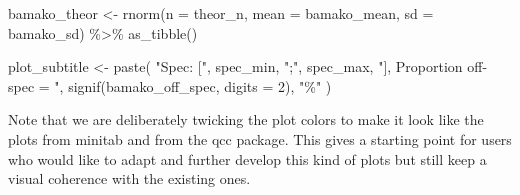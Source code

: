 \documentclass[
]{book}
\newenvironment{Shaded}{\begin{snugshade}}{\end{snugshade}}
\newcommand{\AttributeTok}[1]{\textcolor[rgb]{0.77,0.63,0.00}{#1}}
\newcommand{\DecValTok}[1]{\textcolor[rgb]{0.00,0.00,0.81}{#1}}
\newcommand{\FunctionTok}[1]{\textcolor[rgb]{0.00,0.00,0.00}{#1}}
\newcommand{\NormalTok}[1]{#1}
\newcommand{\OtherTok}[1]{\textcolor[rgb]{0.56,0.35,0.01}{#1}}
\newcommand{\SpecialCharTok}[1]{\textcolor[rgb]{0.00,0.00,0.00}{#1}}
\newcommand{\StringTok}[1]{\textcolor[rgb]{0.31,0.60,0.02}{#1}}
\begin{document}
\begin{Shaded}
\begin{Highlighting}[]
\NormalTok{bamako\_theor }\OtherTok{\textless{}{-}} \FunctionTok{rnorm}\NormalTok{(}\AttributeTok{n =}\NormalTok{ theor\_n, }\AttributeTok{mean =}\NormalTok{ bamako\_mean, }\AttributeTok{sd =}\NormalTok{ bamako\_sd) }\SpecialCharTok{\%\textgreater{}\%} 
  \FunctionTok{as\_tibble}\NormalTok{()}
\end{Highlighting}
\end{Shaded}

\begin{Shaded}
\begin{Highlighting}[]
\NormalTok{plot\_subtitle }\OtherTok{\textless{}{-}} \FunctionTok{paste}\NormalTok{(}
  \StringTok{"Spec: ["}\NormalTok{, spec\_min, }\StringTok{";"}\NormalTok{, spec\_max, }
  \StringTok{"], Proportion off{-}spec = "}\NormalTok{,}
  \FunctionTok{signif}\NormalTok{(bamako\_off\_spec, }\AttributeTok{digits =} \DecValTok{2}\NormalTok{), }\StringTok{"\%"}
\NormalTok{  )}
\end{Highlighting}
\end{Shaded}

Note that we are deliberately twicking the plot colors to make it look like the plots from minitab and from the qcc package. This gives a starting point for users who would like to adapt and further develop this kind of plots but still keep a visual coherence with the existing ones.
\end{document}
